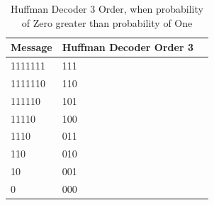 \begin{refsection}
\begin{table}[H]
\centering
\caption{Huffman Decoder 3 Order, when probability of Zero greater than probability of One}
\label{tb:hufmmandecoder5}
\begin{tabular}{|l|l|l|}
\hline
\textbf{Message}                      & \textbf{Huffman Decoder Order 3}                                       \\ \hline
 1111111 &111                                                                           \\ \hline
1111110  &110                                                          \\ \hline
111110    &101                                                    \\ \hline
11110      &100                                              \\ \hline
1110        &011                                                  \\ \hline
110          &010                                                 \\ \hline
10            &001                                              \\ \hline
0              &000                                            \\ \hline
\end{tabular}
\end{table}




\end{refsection}
